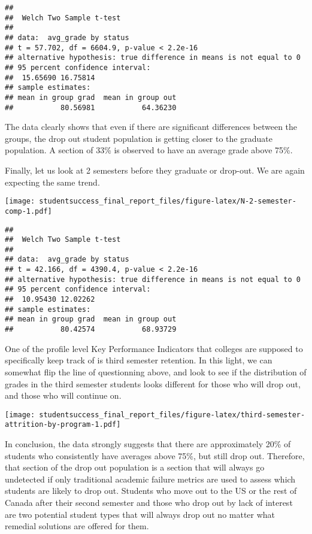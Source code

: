 \documentclass[]{book}
\theoremstyle{definition}
\theoremstyle{definition}
\theoremstyle{remark}
\begin{document}
\begin{verbatim}
## 
##  Welch Two Sample t-test
## 
## data:  avg_grade by status
## t = 57.702, df = 6604.9, p-value < 2.2e-16
## alternative hypothesis: true difference in means is not equal to 0
## 95 percent confidence interval:
##  15.65690 16.75814
## sample estimates:
## mean in group grad  mean in group out 
##           80.56981           64.36230
\end{verbatim}

The data clearly shows that even if there are significant differences
between the groups, the drop out student population is getting closer to
the graduate population. A section of 33\% is observed to have an
average grade above 75\%.

Finally, let us look at 2 semesters before they graduate or drop-out. We
are again expecting the same trend.

\texttt{[image: studentsuccess\_final\_report\_files/figure-latex/N-2-semester-comp-1.pdf]}

\begin{verbatim}
## 
##  Welch Two Sample t-test
## 
## data:  avg_grade by status
## t = 42.166, df = 4390.4, p-value < 2.2e-16
## alternative hypothesis: true difference in means is not equal to 0
## 95 percent confidence interval:
##  10.95430 12.02262
## sample estimates:
## mean in group grad  mean in group out 
##           80.42574           68.93729
\end{verbatim}

One of the profile level Key Performance Indicators that colleges are
supposed to specifically keep track of is third semester retention. In
this light, we can somewhat flip the line of questionning above, and
look to see if the distribution of grades in the third semester students
looks different for those who will drop out, and those who will continue
on.

\texttt{[image: studentsuccess\_final\_report\_files/figure-latex/third-semester-attrition-by-program-1.pdf]}

In conclusion, the data strongly suggests that there are approximately
20\% of students who consistently have averages above 75\%, but still
drop out. Therefore, that section of the drop out population is a
section that will always go undetected if only traditional academic
failure metrics are used to assess which students are likely to drop
out. Students who move out to the US or the rest of Canada after their
second semester and those who drop out by lack of interest are two
potential student types that will always drop out no matter what
remedial solutions are offered for them.
\end{document}
